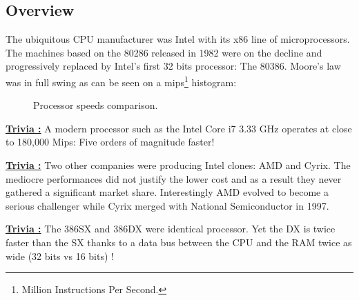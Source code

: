 \documentclass[book.tex]{subfiles}
\begin{document}
  \subsection{Overview}
  The ubiquitous CPU manufacturer was Intel with its x86 line of microprocessors.  The machines based on the 80286 released in 1982 were on the decline and progressively replaced by Intel's first 32 bits processor: The 80386. Moore's law was in full swing as can be seen on a mips\footnote{Million Instructions Per Second.} histogram:




\begin{figure}[H]
\centering
   \caption{Processor speeds comparison.} \label{fig:mips}
 \end{figure}

 \textbf{\underline{Trivia :}} A modern processor such as the Intel Core i7 3.33 GHz operates at close to 180,000 Mips: Five orders of magnitude faster!

 \bigskip

\textbf{\underline{Trivia :}}  Two other companies were producing Intel clones: AMD and Cyrix. The mediocre performances did not justify the lower cost and as a result they never gathered a significant market share. Interestingly AMD evolved to become a serious challenger while Cyrix merged with National Semiconductor in 1997.

 \bigskip
 
 \textbf{\underline{Trivia :}} The 386SX and 386DX were identical processor. Yet the DX is twice faster than the SX thanks to a data bus between the CPU and the RAM twice as wide (32 bits vs 16 bits) !
\end{document}
